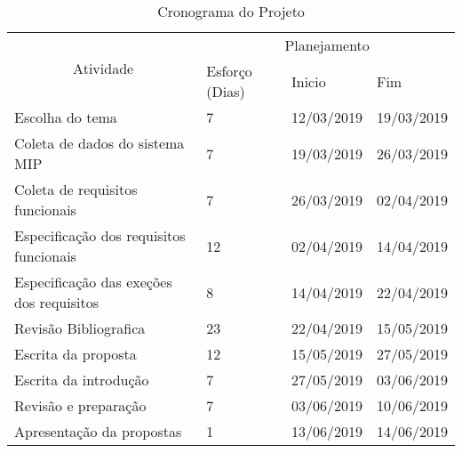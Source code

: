 \begin{table}[H]
\centering
\caption{Cronograma do Projeto}
\label{crono}
\begin{tabular}{|l|l|l|l|}
\hline
\multicolumn{1}{|c|}{\multirow{3}{*}{Atividade}} & \multicolumn{3}{c|}{Planejamento}                                                \\ \cline{2-4} 
\multicolumn{1}{|c|}{}                           & \multirow{2}{*}{Esforço (Dias)} & \multirow{2}{*}{Inicio} & \multirow{2}{*}{Fim} \\
\multicolumn{1}{|c|}{}                           &                                 &                         &                      \\ \hline
Escolha do tema                                  & 7                               & 12/03/2019              & 19/03/2019           \\ \hline
Coleta de dados do sistema MIP                   & 7                               & 19/03/2019              & 26/03/2019           \\ \hline
Coleta de requisitos funcionais                  & 7                               & 26/03/2019              & 02/04/2019           \\ \hline
Especificação dos requisitos funcionais          & 12                              & 02/04/2019              & 14/04/2019           \\ \hline
Especificação das exeções dos requisitos         & 8                               & 14/04/2019              & 22/04/2019           \\ \hline
Revisão Bibliografica                            & 23                              & 22/04/2019              & 15/05/2019           \\ \hline
Escrita da proposta                              & 12                              & 15/05/2019              & 27/05/2019           \\ \hline
Escrita da introdução                            & 7                               & 27/05/2019              & 03/06/2019           \\ \hline
Revisão e preparação                             & 7                               & 03/06/2019              & 10/06/2019           \\ \hline
Apresentação da propostas                        & 1                               & 13/06/2019              & 14/06/2019           \\ \hline

\end{tabular}
\end{table}
